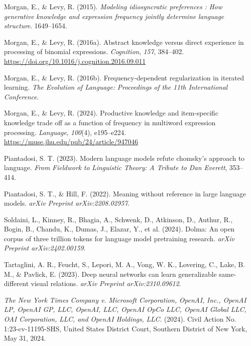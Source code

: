 \documentclass[
  10pt,
  nohyperref]{acl}
\newlength{\cslhangindent}
\newenvironment{CSLReferences}[2] %
 {\begin{list}{}{%
  \setlength{\itemindent}{0pt}
  \setlength{\leftmargin}{0pt}
  \setlength{\parsep}{0pt}
  \ifodd #1
   \setlength{\leftmargin}{\cslhangindent}
   \setlength{\itemindent}{-1\cslhangindent}
  \fi
  \setlength{\itemsep}{#2\baselineskip}}}
 {\end{list}}
\begin{document}
\begin{CSLReferences}{1}{0}
Morgan, E., \& Levy, R. (2015). \emph{Modeling idiosyncratic preferences
: How generative knowledge and expression frequency jointly determine
language structure}. 1649--1654.

Morgan, E., \& Levy, R. (2016a). Abstract knowledge versus direct
experience in processing of binomial expressions. \emph{Cognition},
\emph{157}, 384--402.
\url{https://doi.org/10.1016/j.cognition.2016.09.011}

Morgan, E., \& Levy, R. (2016b). Frequency-dependent regularization in
iterated learning. \emph{The Evolution of Language: Proceedings of the
11th International Conference}.

Morgan, E., \& Levy, R. (2024). Productive knowledge and item-specific
knowledge trade off as a function of frequency in multiword expression
processing. \emph{Language}, \emph{100}(4), e195--e224.
\url{https://muse.jhu.edu/pub/24/article/947046}

Piantadosi, S. T. (2023). Modern language models refute chomsky's
approach to language. \emph{From Fieldwork to Linguistic Theory: A
Tribute to Dan Everett}, 353--414.

Piantadosi, S. T., \& Hill, F. (2022). Meaning without reference in
large language models. \emph{arXiv Preprint arXiv:2208.02957}.

Soldaini, L., Kinney, R., Bhagia, A., Schwenk, D., Atkinson, D., Authur,
R., Bogin, B., Chandu, K., Dumas, J., Elazar, Y., et al. (2024). Dolma:
An open corpus of three trillion tokens for language model pretraining
research. \emph{arXiv Preprint arXiv:2402.00159}.

Tartaglini, A. R., Feucht, S., Lepori, M. A., Vong, W. K., Lovering, C.,
Lake, B. M., \& Pavlick, E. (2023). Deep neural networks can learn
generalizable same-different visual relations. \emph{arXiv Preprint
arXiv:2310.09612}.

\emph{{The New York Times Company v. Microsoft Corporation, OpenAI,
Inc., OpenAI LP, OpenAI GP, LLC, OpenAI, LLC, OpenAI OpCo LLC, OpenAI
Global LLC, OAI Corporation, LLC, and OpenAI Holdings, LLC}}. (2024).
Civil Action No. 1:23-cv-11195-SHS, United States District Court,
Southern District of New York, May 31, 2024.


\end{CSLReferences}
\end{document}
